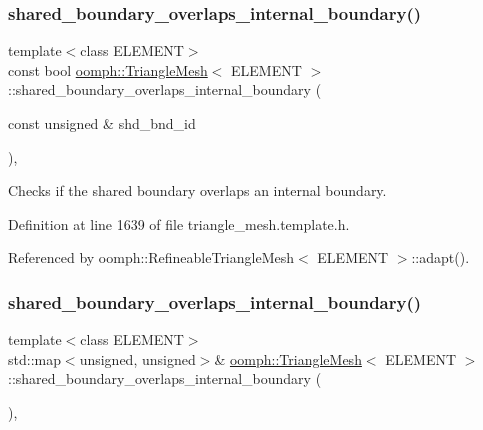 \subsubsection{\texorpdfstring{shared\+\_\+boundary\+\_\+overlaps\+\_\+internal\+\_\+boundary()}{shared\_boundary\_overlaps\_internal\_boundary()}\hspace{0.1cm}{\footnotesize\ttfamily [1/2]}}
{\footnotesize\ttfamily template$<$class E\+L\+E\+M\+E\+NT$>$ \\
const bool \hyperlink{classoomph_1_1TriangleMesh}{oomph\+::\+Triangle\+Mesh}$<$ E\+L\+E\+M\+E\+NT $>$\+::shared\+\_\+boundary\+\_\+overlaps\+\_\+internal\+\_\+boundary (\begin{DoxyParamCaption}\item[{const unsigned \&}]{shd\+\_\+bnd\+\_\+id }\end{DoxyParamCaption})\hspace{0.3cm}{\ttfamily [inline]}, {\ttfamily [protected]}}



Checks if the shared boundary overlaps an internal boundary. 



Definition at line 1639 of file triangle\+\_\+mesh.\+template.\+h.



Referenced by oomph\+::\+Refineable\+Triangle\+Mesh$<$ E\+L\+E\+M\+E\+N\+T $>$\+::adapt().

\mbox{\label{classoomph_1_1TriangleMesh_a2193450432d360bc3b065833c8e34303}} 
\subsubsection{\texorpdfstring{shared\+\_\+boundary\+\_\+overlaps\+\_\+internal\+\_\+boundary()}{shared\_boundary\_overlaps\_internal\_boundary()}\hspace{0.1cm}{\footnotesize\ttfamily [2/2]}}
{\footnotesize\ttfamily template$<$class E\+L\+E\+M\+E\+NT$>$ \\
std\+::map$<$unsigned, unsigned$>$\& \hyperlink{classoomph_1_1TriangleMesh}{oomph\+::\+Triangle\+Mesh}$<$ E\+L\+E\+M\+E\+NT $>$\+::shared\+\_\+boundary\+\_\+overlaps\+\_\+internal\+\_\+boundary (\begin{DoxyParamCaption}{ }\end{DoxyParamCaption})\hspace{0.3cm}{\ttfamily [inline]}, {\ttfamily [protected]}}



